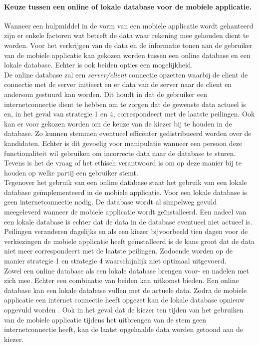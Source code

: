 \paragraph{Keuze tussen een online of lokale database voor de mobiele applicatie.}
Wanneer een hulpmiddel in de vorm van een mobiele applicatie wordt gehanteerd zijn er enkele factoren wat betreft de data waar rekening mee gehouden dient te worden. Voor het verkrijgen van de data en de informatie tonen aan de gebruiker van de mobiele applicatie kan gekozen worden tussen een online database en een lokale database. Echter is ook beiden opties een mogelijkheid.  \\
\indent De online database zal een \textit{server/client} \citep{Chapt17:online} connectie opzetten waarbij de client de connectie met de server initieert en er data van de server naar de client en andersom gestuurd kan worden. Dit houdt in dat de gebruiker een internetconnectie dient te hebben om te zorgen dat de gewenste data actueel is en, in het geval van strategie 1 en 4, correspondeert met de laatste peilingen. Ook kan er voor gekozen worden om de keuze van de kiezer bij te houden in de database. Zo kunnen stemmen eventueel effic\"{e}nter gedistribueerd worden over de kandidaten. Echter is dit gevoelig voor manipulatie wanneer een persoon deze functionaliteit wil gebruiken om incorrecte data naar de database te sturen. Tevens is het de vraag of het ethisch verantwoord is om op deze manier bij te houden op welke partij een gebruiker stemt. \\
\indent Tegenover het gebruik van een online database staat het gebruik van een lokale database ge\"{i}mplementeerd in de mobiele applicatie. Voor een lokale database is geen internetconnectie nodig. De database wordt al simpelweg gevuld meegeleverd wanneer de mobiele applicatie wordt ge\"{i}nstalleerd. Een nadeel van een lokale database is echter dat de data in de database eventueel niet actueel is. Peilingen veranderen dagelijks en als een kiezer bijvoorbeeld tien dagen voor de verkiezingen de mobiele applicatie heeft ge\"{i}nstalleerd is de kans groot dat de data niet meer correspondeert met de laatste peilingen. Zodoende worden op de manier strategie 1 en strategie 4 waarschijnlijk niet optimaal uitgevoerd. \\
\indent Zowel een online database als een lokale database brengen voor- en nadelen met zich mee. Echter een combinatie van beiden kan uitkomst bieden. Een online database kan een lokale database vullen met de actuele data. Zodra de mobiele applicatie een internet connectie heeft opgezet kan de lokale database opnieuw opgevuld worden \citep{silberschatz1997database}. Ook in het geval dat de kiezer ten tijden van het gebruiken van de mobiele applicatie tijdens het uitbrengen van de stem geen internetconnectie heeft, kan de laatst opgehaalde data worden getoond aan de kiezer.


